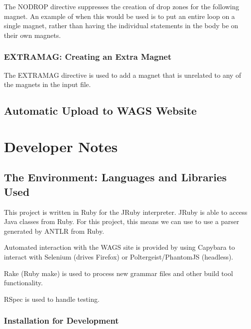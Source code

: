 \documentclass[letter,10pt]{article}
\begin{document}
The NODROP directive suppresses the creation of drop zones for the 
following magnet. An example of when this would be used is to put an 
entire loop on a single magnet, rather than having the individual 
statements in the body be on their own magnets.


\subsubsection{EXTRAMAG: Creating an Extra Magnet}

The EXTRAMAG directive is used to add a magnet that is unrelated to any 
of the magnets in the input file. 



\subsection{Automatic Upload to WAGS Website}

\section{Developer Notes}

\subsection{The Environment: Languages and Libraries Used}


This project is written in Ruby for the JRuby interpreter. JRuby is able
to access Java classes from Ruby. For this project, this means we can 
use to use a parser generated by ANTLR from Ruby.

Automated interaction with the WAGS site is provided by using Capybara 
to interact with Selenium (drives Firefox) or Poltergeist/PhantomJS 
(headless).

Rake (Ruby make) is used to process new grammar files and other build 
tool functionality.

RSpec is used to handle testing.

\subsubsection{Installation for Development}
\end{document}

